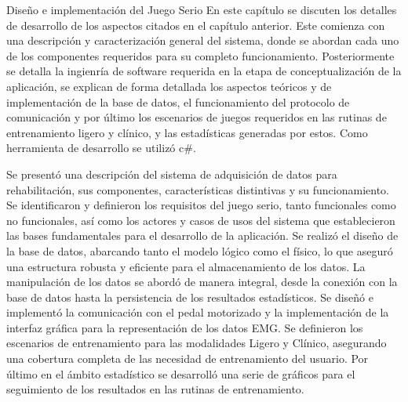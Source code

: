 \begin{thesischapter}{2} {Diseño e implementación del Juego Serio}
En este capítulo se discuten los detalles de desarrollo de los aspectos citados en el capítulo anterior. Este comienza con una descripción y caracterización general del sistema, donde se  abordan cada uno de los componentes requeridos para su completo funcionamiento. Posteriormente se detalla la ingienría de software requerida en la etapa de conceptualización de la aplicación, se explican de forma detallada los aspectos teóricos y de implementación de la base de datos, el funcionamiento del protocolo de comunicación y por último los escenarios de juegos requeridos en las rutinas de entrenamiento ligero y clínico, y las estadísticas generadas por estos. Como herramienta de desarrollo se utilizó c\#.


     
    

















Se presentó una descripción del sistema de adquisición de datos para rehabilitación, sus componentes, características distintivas y su funcionamiento. Se identificaron y definieron los requisitos del juego  serio, tanto funcionales como no funcionales, así como los actores y casos de usos del sistema que establecieron las bases fundamentales para el desarrollo de la aplicación. Se realizó el diseño de la base de datos, abarcando tanto el modelo lógico como el físico, lo que aseguró una estructura robusta y eficiente para el almacenamiento de los datos. La manipulación de los datos se abordó de manera integral, desde la conexión con la base de datos hasta la persistencia de los resultados estadísticos. Se diseñó e implementó la comunicación con el pedal motorizado y la implementación de la interfaz gráfica para la representación de los datos EMG. Se definieron los escenarios de entrenamiento para las modalidades Ligero y Clínico, asegurando una cobertura completa de las necesidad de entrenamiento del usuario. Por último en el ámbito estadístico se desarrolló una serie de gráficos para el seguimiento de los resultados en las rutinas de entrenamiento.   
    
\end{thesischapter}
